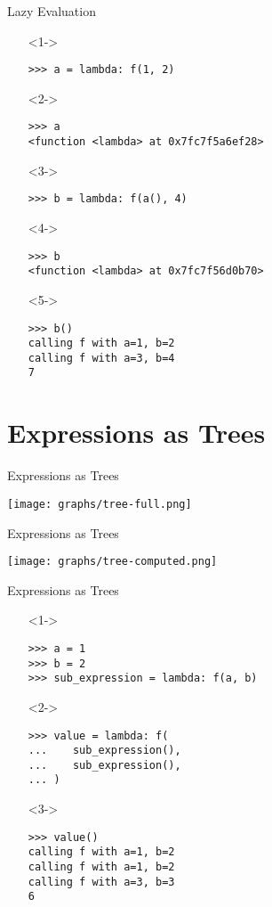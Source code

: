 \documentclass{beamer}
\begin{document}
\begin{frame}[fragile]{Lazy Evaluation}
  \begin{itemize}
  \item[]<1-> \begin{verbatim}
>>> a = lambda: f(1, 2)
    \end{verbatim}
  \item[]<2-> \begin{verbatim}
>>> a
<function <lambda> at 0x7fc7f5a6ef28>
    \end{verbatim}
  \item[]<3-> \begin{verbatim}
>>> b = lambda: f(a(), 4)
    \end{verbatim}
  \item[]<4-> \begin{verbatim}
>>> b
<function <lambda> at 0x7fc7f56d0b70>
    \end{verbatim}
  \item[]<5-> \begin{verbatim}
>>> b()
calling f with a=1, b=2
calling f with a=3, b=4
7
    \end{verbatim}
  \end{itemize}
\end{frame}

\section{Expressions as Trees}

\begin{frame}{Expressions as Trees}
  \begin{center}
    \texttt{[image: graphs/tree-full.png]}
  \end{center}
\end{frame}

\begin{frame}{Expressions as Trees}
  \begin{center}
    \texttt{[image: graphs/tree-computed.png]}
  \end{center}
\end{frame}

\begin{frame}[fragile]{Expressions as Trees}
  \begin{itemize}
    \item[]<1-> \begin{verbatim}
>>> a = 1
>>> b = 2
>>> sub_expression = lambda: f(a, b)
    \end{verbatim}
  \item[]<2-> \begin{verbatim}
>>> value = lambda: f(
...    sub_expression(),
...    sub_expression(),
... )
    \end{verbatim}
  \item[]<3-> \begin{verbatim}
>>> value()
calling f with a=1, b=2
calling f with a=1, b=2
calling f with a=3, b=3
6
    \end{verbatim}
  \end{itemize}
\end{frame}
\end{document}
